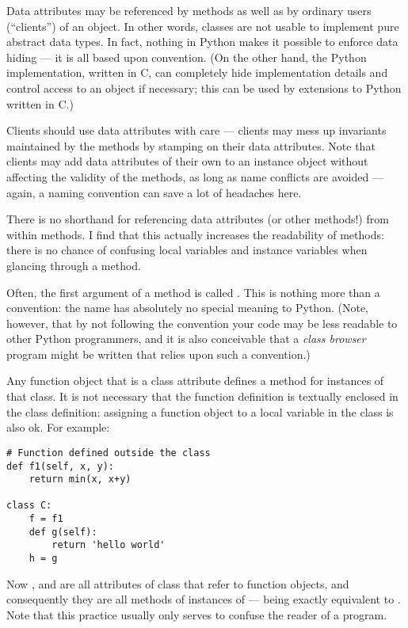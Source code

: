 \documentclass{manual}
\begin{document}
Data attributes may be referenced by methods as well as by ordinary
users (``clients'') of an object.  In other words, classes are not
usable to implement pure abstract data types.  In fact, nothing in
Python makes it possible to enforce data hiding --- it is all based
upon convention.  (On the other hand, the Python implementation,
written in C, can completely hide implementation details and control
access to an object if necessary; this can be used by extensions to
Python written in C.)


Clients should use data attributes with care --- clients may mess up
invariants maintained by the methods by stamping on their data
attributes.  Note that clients may add data attributes of their own to
an instance object without affecting the validity of the methods, as
long as name conflicts are avoided --- again, a naming convention can
save a lot of headaches here.


There is no shorthand for referencing data attributes (or other
methods!) from within methods.  I find that this actually increases
the readability of methods: there is no chance of confusing local
variables and instance variables when glancing through a method.


Often, the first argument of a method is called
.  This is nothing more than a convention: the name
 has absolutely no special meaning to Python.  (Note,
however, that by not following the convention your code may be less
readable to other Python programmers, and it is also conceivable that
a \emph{class browser} program might be written that relies upon such a
convention.)


Any function object that is a class attribute defines a method for
instances of that class.  It is not necessary that the function
definition is textually enclosed in the class definition: assigning a
function object to a local variable in the class is also ok.  For
example:

\begin{verbatim}
# Function defined outside the class
def f1(self, x, y):
    return min(x, x+y)

class C:
    f = f1
    def g(self):
        return 'hello world'
    h = g
\end{verbatim}

Now ,  and  are all attributes of class
 that refer to function objects, and consequently they are all
methods of instances of  ---  being exactly equivalent
to .  Note that this practice usually only serves to confuse
the reader of a program.
\end{document}
